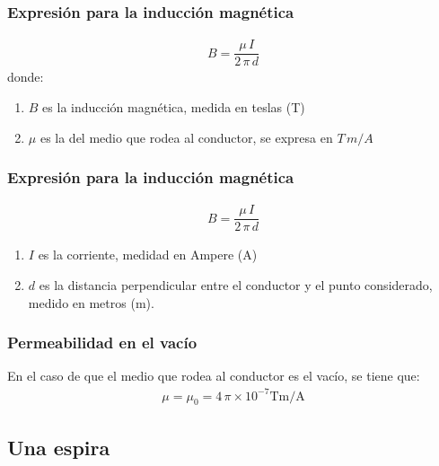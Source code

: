 \documentclass[14pt]{beamer}
\begin{document}
\begin{frame}
\frametitle{Expresión para la inducción magnética}
\begin{align*}
B = \dfrac{\mu \, I}{2 \, \pi \, d}
\end{align*}
donde:
\begin{enumerate}[<+->]
\item $B$ es la inducción magnética, medida en teslas (T)
\item $\mu$ es la  del medio que rodea al conductor, se expresa en $T \, m/A$
\seti
\end{enumerate}
\end{frame}
\begin{frame}
\frametitle{Expresión para la inducción magnética}
\begin{align*}
B = \dfrac{\mu \, I}{2 \, \pi \, d}
\end{align*}
\begin{enumerate}[<+->]    
\conti
\item $I$ es la corriente, medidad en Ampere (A)
\item $d$ es la distancia perpendicular entre el conductor y el punto considerado, medido en metros (m).
\end{enumerate}
\end{frame}
\begin{frame}
\frametitle{Permeabilidad en el vacío}
En el caso de que el medio que rodea al conductor es el vacío, se tiene que:
\pause
\begin{align*}
\mu = \mu_{0} = 4 \, \pi \times 10^{-7} \unit{\tesla\meter\per\ampere}
\end{align*}
\end{frame}

\subsection{Una espira}
\end{document}
